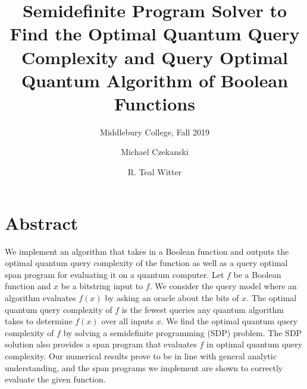 \documentclass[acmtog]{acmart}
\begin{document}
\title[Optimal Quantum Algorithms via Semidefinite Programming]{Semidefinite Program Solver to 
Find the Optimal Quantum Query Complexity
and Query Optimal Quantum Algorithm
of Boolean Functions}

\subtitle{Middlebury College, Fall 2019}

\author{Michael Czekanski}

\author{R. Teal Witter}

\maketitle

\graphicspath{{./../figures/}}
\section*{Abstract}

We implement an algorithm that takes in a 
Boolean function and outputs the optimal
quantum query complexity of the function 
as well as a query optimal span program
for evaluating it on a quantum computer. 
Let $f$ be a Boolean function
and $x$ be a bitstring input to $f$.
We consider the query model where
an algorithm evaluates $f(x)$
by asking an oracle about the bits of $x$.
The optimal quantum query complexity of $f$
is the fewest queries any quantum algorithm
takes to determine $f(x)$ over all inputs $x$.
We find the optimal quantum query complexity
of $f$ by solving a semidefinite 
programming (SDP) problem.
The SDP solution also provides a span program 
that evaluates $f$ in optimal
quantum query complexity. Our numerical results prove to be in line with general analytic understanding, and the span programs we implement are shown to correctly evaluate the given function.









\end{document}
